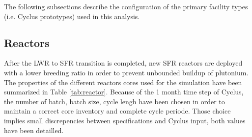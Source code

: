 \documentclass[12pt]{article}
\begin{document}
The following subsections describe the configuration of the primary facility
types (i.e. Cyclus prototypes) used in this analysis.

\subsection{Reactors}

After the LWR to SFR transition is completed, new SFR reactors are deployed with a
lower breeding ratio in order to prevent unbounded buildup of plutonium. The
properties of the different reactors cores used for the simulation have been
summarized in Table \ref{tab:reactor}. Because of the 1 month time step of Cyclus,
the number of batch, batch size, cycle lengh have been chosen in order to maintain
a correct core inventory and complete cycle periode. Those choice implies small
discrepencies between specifications and Cyclus input, both values have been
detailled.

\end{document}
